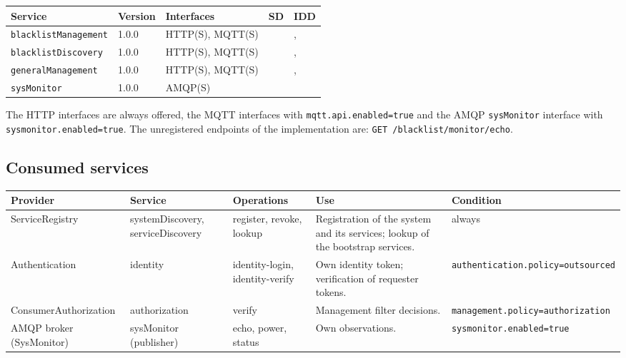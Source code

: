\documentclass[a4paper]{arrowhead}
\begin{document}
\noindent\begin{longtable}{| p{5.3cm} | p{1.3cm} | p{2.6cm} | p{1.6cm} | p{3.6cm} |} \hline
\rowcolor{gray!33} Service & Version & Interfaces & SD & IDD \\ \hline \endhead
\texttt{blacklist\allowbreak{}Management} & 1.0.0 & HTTP(S), MQTT(S) & \cite{bl-blacklistManagement-sd} & \cite{bl-blacklistManagement-http-idd}, \cite{bl-blacklistManagement-mqtt-idd} \\ \hline
\texttt{blacklistDiscovery} & 1.0.0 & HTTP(S), MQTT(S) & \cite{bl-blacklistDiscovery-sd} & \cite{bl-blacklistDiscovery-http-idd}, \cite{bl-blacklistDiscovery-mqtt-idd} \\ \hline
\texttt{generalManagement} & 1.0.0 & HTTP(S), MQTT(S) & \cite{bl-generalManagement-sd} & \cite{bl-generalManagement-http-idd}, \cite{bl-generalManagement-mqtt-idd} \\ \hline
\texttt{sysMonitor} & 1.0.0 & AMQP(S) & \cite{bl-sysMonitor-sd} & \cite{bl-sysMonitor-amqp-idd} \\ \hline
\end{longtable}

The HTTP interfaces are always offered, the MQTT interfaces with \texttt{mqtt.api.enabled=true} and the AMQP \texttt{sysMonitor} interface with \texttt{sysmonitor.enabled=true}. The unregistered endpoints of the implementation are: \texttt{GET /\allowbreak{}blacklist/\allowbreak{}monitor/\allowbreak{}echo}.

\subsection{Consumed services}

\noindent\begin{longtable}{| >{\raggedright\arraybackslash}p{2.9cm} | >{\raggedright\arraybackslash}p{3.1cm} | >{\raggedright\arraybackslash}p{2.5cm} | p{3.6cm} | >{\raggedright\arraybackslash}p{2.9cm} |} \hline
\rowcolor{gray!33} Provider & Service & Operations & Use & Condition \\ \hline \endhead
ServiceRegistry & systemDiscovery, serviceDiscovery & register, revoke, lookup & Registration of the system and its services; lookup of the bootstrap services. & always \\ \hline
Authentication & identity & identity-login, identity-verify & Own identity token; verification of requester tokens. & \texttt{authentication.\allowbreak{}policy=\allowbreak{}outsourced} \\ \hline
Consumer\allowbreak{}Authorization & authorization & verify & Management filter decisions. & \texttt{management.\allowbreak{}policy=\allowbreak{}authorization} \\ \hline
AMQP broker (SysMonitor) & sysMonitor (publisher) & echo, power, status & Own observations. & \texttt{sysmonitor.\allowbreak{}enabled=\allowbreak{}true} \\ \hline
\end{longtable}
\end{document}
